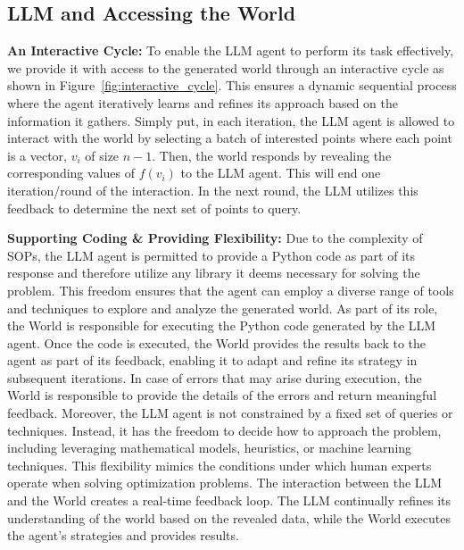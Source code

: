 \subsection{LLM and Accessing the World}
\textbf{An Interactive Cycle:}
To enable the LLM agent to perform its task effectively, we provide it with access to the generated world through an interactive cycle as shown in Figure~\ref{fig:interactive_cycle}. This ensures a dynamic sequential process where the agent iteratively learns and refines its approach based on the information it gathers. 
Simply put, in each iteration, the LLM agent is allowed to interact with the world by selecting a batch of interested points where each point is a vector, $v_i$ of size $n-1$. Then, the world responds by revealing the corresponding values of $f(v_i)$ to the LLM agent. This will end one iteration/round of the interaction. In the next round, the LLM utilizes this feedback to determine the next set of points to query. 

\textbf{Supporting Coding \& Providing Flexibility:}
Due to the complexity of SOPs, the LLM agent is permitted to provide a Python code as part of its response and therefore utilize any library it deems necessary for solving the problem. This freedom ensures that the agent can employ a diverse range of tools and techniques to explore and analyze the generated world. As part of its role, the World is responsible for executing the Python code generated by the LLM agent. Once the code is executed, the World provides the results back to the agent as part of its feedback, enabling it to adapt and refine its strategy in subsequent iterations. In case of errors that may arise during execution, the World is responsible to provide the details of the errors and return meaningful feedback. Moreover, the LLM agent is not constrained by a fixed set of queries or techniques. Instead, it has the freedom to decide how to approach the problem, including leveraging mathematical models, heuristics, or machine learning techniques. This flexibility mimics the conditions under which human experts operate when solving optimization problems.
The interaction between the LLM and the World creates a real-time feedback loop. The LLM continually refines its understanding of the world based on the revealed data, while the World executes the agent’s strategies and provides results.

